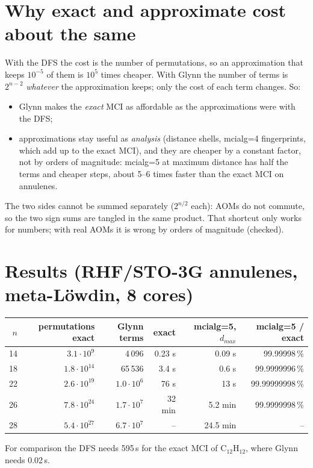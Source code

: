 \documentclass[11pt,a4paper]{article}
\begin{document}
\section{Why exact and approximate cost about the same}
With the DFS the cost is the number of permutations, so an approximation that keeps $10^{-5}$ of them is $10^5$ times
cheaper. With Glynn the number of terms is $2^{n-2}$ \emph{whatever} the approximation keeps; only the cost of each term
changes. So:
\begin{itemize}\itemsep0pt
\item Glynn makes the \emph{exact} MCI as affordable as the approximations were with the DFS;
\item approximations stay useful as \emph{analysis} (distance shells, mcialg=4 fingerprints, which add up to the exact
      MCI), and they are cheaper by a constant factor, not by orders of magnitude: mcialg=5 at maximum distance has half the
      terms and cheaper steps, about 5--6 times faster than the exact MCI on annulenes.
\end{itemize}
The two sides cannot be summed separately ($2^{n/2}$ each): AOMs do not commute, so the two sign sums are tangled in the
same product. That shortcut only works for numbers; with real AOMs it is wrong by orders of magnitude (checked).

\section{Results (RHF/STO-3G annulenes, meta-L\"owdin, 8 cores)}
\begin{center}
\begin{tabular}{rrrrrr}
\toprule
$n$ & permutations exact & Glynn terms & exact & mcialg=5, $d_{max}$ & mcialg=5 / exact\\ \midrule
14 & $3.1\cdot10^{9}$ & 4\,096 & 0.23 s & 0.09 s & 99.99998\,\%\\
18 & $1.8\cdot10^{14}$ & 65\,536 & 3.4 s & 0.6 s & 99.9999996\,\%\\
22 & $2.6\cdot10^{19}$ & $1.0\cdot10^{6}$ & 76 s & 13 s & 99.99999998\,\%\\
26 & $7.8\cdot10^{24}$ & $1.7\cdot10^{7}$ & 32 min & 5.2 min & 99.9999998\,\%\\
28 & $5.4\cdot10^{27}$ & $6.7\cdot10^{7}$ & -- & 24.5 min & --\\ \bottomrule
\end{tabular}
\end{center}
For comparison the DFS needs 595\,s for the exact MCI of C$_{12}$H$_{12}$, where Glynn needs 0.02\,s.
\end{document}

